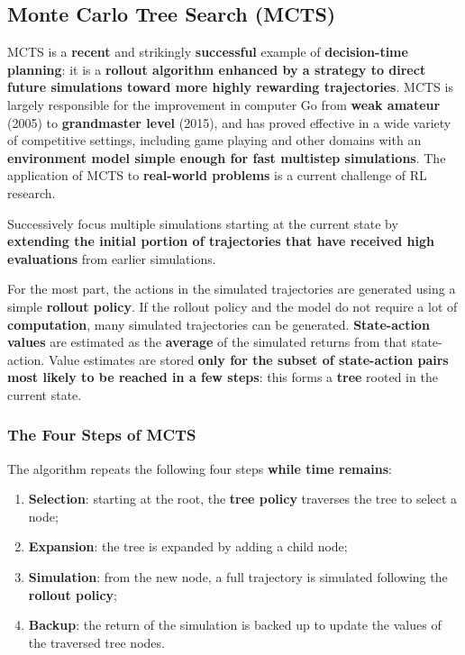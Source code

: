 \documentclass[11pt,a4paper]{article}
\theoremstyle{definition}
\theoremstyle{plain}
\theoremstyle{remark}
\begin{document}
\subsection{Monte Carlo Tree Search (MCTS)}

MCTS is a \textbf{recent} and strikingly \textbf{successful} example of \textbf{decision-time planning}: it is a \textbf{rollout algorithm enhanced by a strategy to direct future simulations toward more highly rewarding trajectories}. MCTS is largely responsible for the improvement in computer Go from \textbf{weak amateur} (2005) to \textbf{grandmaster level} (2015), and has proved effective in a wide variety of competitive settings, including game playing and other domains with an \textbf{environment model simple enough for fast multistep simulations}. The application of MCTS to \textbf{real-world problems} is a current challenge of RL research.

\begin{tcolorbox}[colback=red!5!white, colframe=red!70!black, title={Core Idea of MCTS}]
Successively focus multiple simulations starting at the current state by \textbf{extending the initial portion of trajectories that have received high evaluations} from earlier simulations.
\end{tcolorbox}

For the most part, the actions in the simulated trajectories are generated using a simple \textbf{rollout policy}. If the rollout policy and the model do not require a lot of \textbf{computation}, many simulated trajectories can be generated. \textbf{State-action values} are estimated as the \textbf{average} of the simulated returns from that state-action. Value estimates are stored \textbf{only for the subset of state-action pairs most likely to be reached in a few steps}: this forms a \textbf{tree} rooted in the current state.

\subsubsection{The Four Steps of MCTS}

The algorithm repeats the following four steps \textbf{while time remains}:
\begin{enumerate}
    \item \textbf{Selection}: starting at the root, the \textbf{tree policy} traverses the tree to select a node;
    \item \textbf{Expansion}: the tree is expanded by adding a child node;
    \item \textbf{Simulation}: from the new node, a full trajectory is simulated following the \textbf{rollout policy};
    \item \textbf{Backup}: the return of the simulation is backed up to update the values of the traversed tree nodes.
\end{enumerate}
\end{document}
